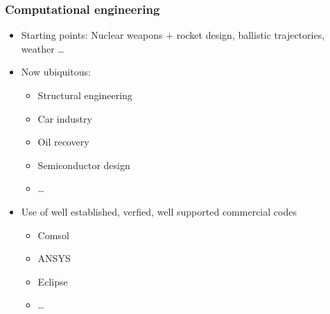 \begin{frame}\frametitle{Computational engineering}

  \begin{itemize}
  \item
    Starting points: Nuclear weapons + rocket design, ballistic
    trajectories, weather \ldots{}
  \item
    Now ubiquitous:

    \begin{itemize}
      \tightlist
    \item
      Structural engineering
    \item
      Car industry
    \item
      Oil recovery
    \item
      Semiconductor design
    \item
      \ldots{}
    \end{itemize}
  \item
    Use of well established, verfied, well supported commercial codes

    \begin{itemize}
      \tightlist
    \item
      Comsol
    \item
      ANSYS
    \item
      Eclipse
    \item
      \ldots{}
    \end{itemize}
  \end{itemize}

\end{frame}

